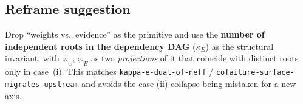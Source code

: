\documentclass[11pt,a4paper]{article}
\begin{document}
\subsection*{Reframe suggestion}

Drop ``weights vs.\ evidence'' as the primitive and use the \textbf{number of independent roots in
the dependency DAG} ($\kappa_E$) as the structural invariant, with $\varphi_w$, $\varphi_E$ as two
\emph{projections} of it that coincide with distinct roots only in case~(i).
This matches \texttt{kappa-e-dual-of-neff} / \texttt{cofailure-surface-migrates-upstream} and
avoids the case-(ii) collapse being mistaken for a new axis.
\end{document}
